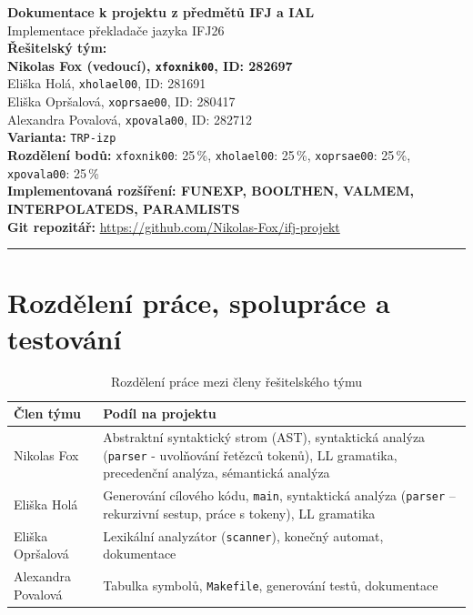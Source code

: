 \documentclass[11pt,a4paper]{article}
\begin{document}
\vspace*{\fill}
\begin{center}
    {\LARGE \textbf{Dokumentace k projektu z předmětů IFJ a IAL}}\\[6pt]
    {\large Implementace překladače jazyka IFJ26}\\[12pt]

    \textbf{Řešitelský tým:}\\
    \textbf{Nikolas Fox (vedoucí), \texttt{xfoxnik00}, ID: 282697}\\
    Eliška Holá, \texttt{xholael00}, ID: 281691\\
    Eliška Opršalová, \texttt{xoprsae00}, ID: 280417\\
    Alexandra Povalová, \texttt{xpovala00}, ID: 282712\\[8pt]

    \textbf{Varianta:} \texttt{TRP-izp}\\[4pt]
    \textbf{Rozdělení bodů:} \texttt{xfoxnik00}: 25\,\%, \texttt{xholael00}: 25\,\%, \texttt{xoprsae00}: 25\,\%, \texttt{xpovala00}: 25\,\%\\[4pt]
    \textbf{Implementovaná rozšíření: FUNEXP, BOOLTHEN, VALMEM, INTERPOLATEDS, PARAMLISTS} \\[4pt]
    \textbf{Git repozitář:} \url{https://github.com/Nikolas-Fox/ifj-projekt}\\[10pt]
    \hrule
\end{center}
\vspace*{\fill}
\newpage


\section{Rozdělení práce, spolupráce a testování}
\begin{table}[htbp]
    \centering
    \small
    \begin{tabularx}{\textwidth}{@{} l X @{}}
        \toprule
        \textbf{Člen týmu} & \textbf{Podíl na projektu} \\
        \midrule
        Nikolas Fox & Abstraktní syntaktický strom (AST), syntaktická analýza (\texttt{parser} - uvolňování řetězců tokenů), LL gramatika, precedenční analýza, sémantická analýza \\
        Eliška Holá & Generování cílového kódu, \texttt{main}, syntaktická analýza (\texttt{parser} -- rekurzivní sestup, práce s tokeny), LL gramatika \\
        Eliška Opršalová & Lexikální analyzátor (\texttt{scanner}), konečný automat, dokumentace \\
        Alexandra Povalová & Tabulka symbolů, \texttt{Makefile}, generování testů, dokumentace \\
        \bottomrule
    \end{tabularx}
    \caption{Rozdělení práce mezi členy řešitelského týmu}
    \label{tab:rozdeleni}
\end{table}
\end{document}
